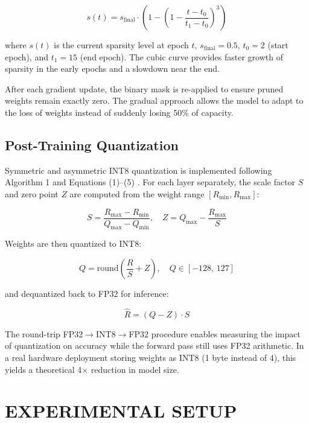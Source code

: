 \documentclass[letterpaper, 10 pt, conference]{ieeeconf}
\begin{document}
\begin{equation}
  s(t) = s_{\text{final}} \cdot \left( 1 - \left(1 - \frac{t - t_0}{t_1 - t_0}\right)^3 \right)
\end{equation}

where $s(t)$ is the current sparsity level at epoch $t$, $s_{\text{final}}=0.5$, $t_0=2$ (start epoch), and $t_1=15$ (end epoch).
The cubic curve provides faster growth of sparsity in the early epochs and a slowdown near the end.

After each gradient update, the binary mask is re-applied to ensure pruned weights remain exactly zero.
The gradual approach allows the model to adapt to the loss of weights instead of suddenly losing 50\% of capacity.

\subsection{Post-Training Quantization}

Symmetric and asymmetric INT8 quantization is implemented following Algorithm 1 and Equations (1)--(5) \cite{li2023survey}.
For each layer separately, the scale factor $S$ and zero point $Z$ are computed from the weight range $[R_{\min}, R_{\max}]$:

\begin{equation}
  S = \frac{R_{\max} - R_{\min}}{Q_{\max} - Q_{\min}}, \quad
  Z = Q_{\max} - \frac{R_{\max}}{S}
\end{equation}

Weights are then quantized to INT8:

\begin{equation}
  Q = \mathrm{round}\!\left(\frac{R}{S} + Z\right), \quad Q \in [-128,\,127]
\end{equation}

and dequantized back to FP32 for inference:

\begin{equation}
  \hat{R} = (Q - Z) \cdot S
\end{equation}

The round-trip FP32$\rightarrow$INT8$\rightarrow$FP32 procedure enables measuring the impact of quantization on accuracy while the forward pass still uses FP32 arithmetic.
In a real hardware deployment storing weights as INT8 (1 byte instead of 4), this yields a theoretical 4$\times$ reduction in model size.

\section{\textbf{EXPERIMENTAL SETUP}}
\end{document}
